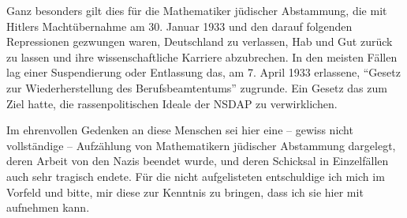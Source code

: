 Ganz besonders gilt dies für die Mathematiker jüdischer Abstammung, die mit Hitlers Machtübernahme am 30. Januar 1933 und den darauf folgenden Repressionen gezwungen waren, Deutschland zu verlassen, Hab und Gut zurück zu lassen und ihre wissenschaftliche Karriere abzubrechen. In den meisten Fällen lag einer Suspendierung oder Entlassung das, am 7. April 1933 erlassene, "`Gesetz zur Wiederherstellung des Berufsbeamtentums"' zugrunde. Ein Gesetz das zum Ziel hatte, die rassenpolitischen Ideale der NSDAP zu verwirklichen. 

Im ehrenvollen Gedenken an diese Menschen sei hier eine -- gewiss nicht vollständige -- Aufzählung von Mathematikern jüdischer Abstammung dargelegt, deren Arbeit von den Nazis beendet wurde, und deren Schicksal in Einzelfällen auch sehr tragisch endete. Für die nicht aufgelisteten entschuldige ich mich im Vorfeld und bitte, mir diese zur Kenntnis zu bringen, dass ich sie hier mit aufnehmen kann.


